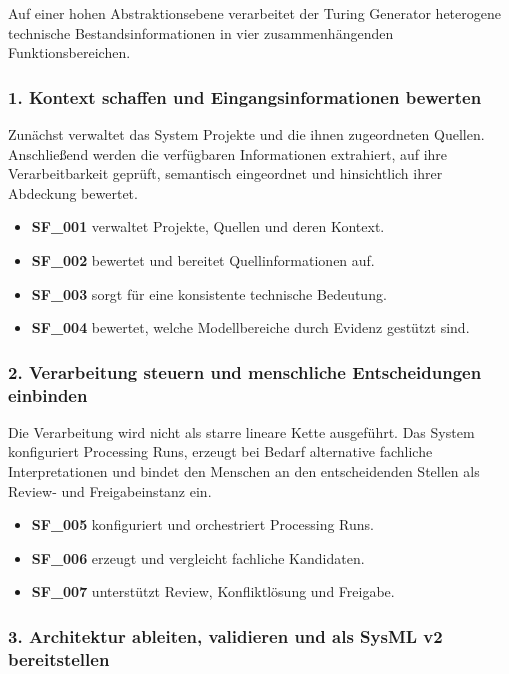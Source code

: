 Auf einer hohen Abstraktionsebene verarbeitet der Turing Generator
heterogene technische Bestandsinformationen in vier zusammenhängenden
Funktionsbereichen.

\subsubsection*{1. Kontext schaffen und Eingangsinformationen bewerten}

Zunächst verwaltet das System Projekte und die ihnen zugeordneten Quellen.
Anschließend werden die verfügbaren Informationen extrahiert, auf ihre
Verarbeitbarkeit geprüft, semantisch eingeordnet und hinsichtlich ihrer
Abdeckung bewertet.

\begin{itemize}[leftmargin=7mm,itemsep=1mm]
  \item \textbf{SF\_001} verwaltet Projekte, Quellen und deren Kontext.
  \item \textbf{SF\_002} bewertet und bereitet Quellinformationen auf.
  \item \textbf{SF\_003} sorgt für eine konsistente technische Bedeutung.
  \item \textbf{SF\_004} bewertet, welche Modellbereiche durch Evidenz gestützt sind.
\end{itemize}

\subsubsection*{2. Verarbeitung steuern und menschliche Entscheidungen einbinden}

Die Verarbeitung wird nicht als starre lineare Kette ausgeführt. Das System
konfiguriert Processing Runs, erzeugt bei Bedarf alternative fachliche
Interpretationen und bindet den Menschen an den entscheidenden Stellen als
Review- und Freigabeinstanz ein.

\begin{itemize}[leftmargin=7mm,itemsep=1mm]
  \item \textbf{SF\_005} konfiguriert und orchestriert Processing Runs.
  \item \textbf{SF\_006} erzeugt und vergleicht fachliche Kandidaten.
  \item \textbf{SF\_007} unterstützt Review, Konfliktlösung und Freigabe.
\end{itemize}

\subsubsection*{3. Architektur ableiten, validieren und als SysML v2 bereitstellen}

